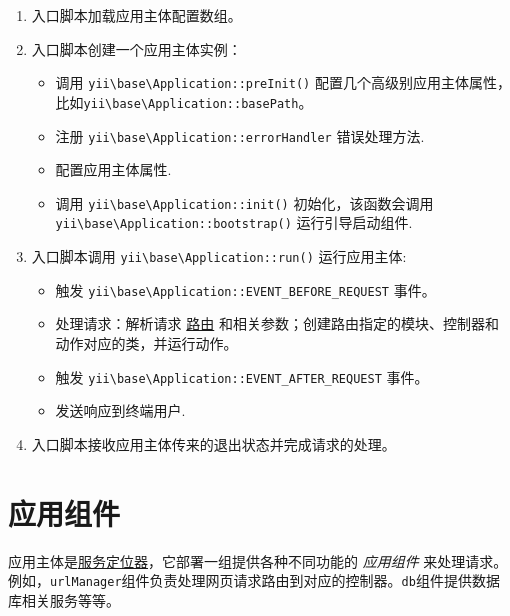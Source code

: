 \begin{enumerate}
\item 入口脚本加载应用主体配置数组。
\item 入口脚本创建一个应用主体实例：\begin{itemize}
\item 调用 \texttt{yii{\allowbreak{}\textbackslash}base{\allowbreak{}\textbackslash}Application\allowbreak{}::\allowbreak{}preInit()} 配置几个高级别应用主体属性，比如\texttt{yii{\allowbreak{}\textbackslash}base{\allowbreak{}\textbackslash}Application\allowbreak{}::\allowbreak{}basePath}。
\item 注册 \texttt{yii{\allowbreak{}\textbackslash}base{\allowbreak{}\textbackslash}Application\allowbreak{}::\allowbreak{}errorHandler} 错误处理方法.
\item 配置应用主体属性.
\item 调用 \texttt{yii{\allowbreak{}\textbackslash}base{\allowbreak{}\textbackslash}Application\allowbreak{}::\allowbreak{}init()} 初始化，该函数会调用 \texttt{yii{\allowbreak{}\textbackslash}base{\allowbreak{}\textbackslash}Application\allowbreak{}::\allowbreak{}bootstrap()} 运行引导启动组件.
\end{itemize}

\item 入口脚本调用 \texttt{yii{\allowbreak{}\textbackslash}base{\allowbreak{}\textbackslash}Application\allowbreak{}::\allowbreak{}run()} 运行应用主体:\begin{itemize}
\item 触发 \texttt{yii{\allowbreak{}\textbackslash}base{\allowbreak{}\textbackslash}Application\allowbreak{}::\allowbreak{}EVENT\_BEFORE\_REQUEST} 事件。
\item 处理请求：解析请求 \hyperref[runtime-routing.md]{路由} 和相关参数；创建路由指定的模块、控制器和动作对应的类，并运行动作。
\item 触发 \texttt{yii{\allowbreak{}\textbackslash}base{\allowbreak{}\textbackslash}Application\allowbreak{}::\allowbreak{}EVENT\_AFTER\_REQUEST} 事件。
\item 发送响应到终端用户.
\end{itemize}

\item 入口脚本接收应用主体传来的退出状态并完成请求的处理。
\end{enumerate}


\label{structure-application-components.md}\section{应用组件}
应用主体是\hyperref[concept-service-locator.md]{服务定位器}，它部署一组提供各种不同功能的 \textit{应用组件} 来处理请求。
例如，\lstinline|urlManager|组件负责处理网页请求路由到对应的控制器。\lstinline|db|组件提供数据库相关服务等等。


